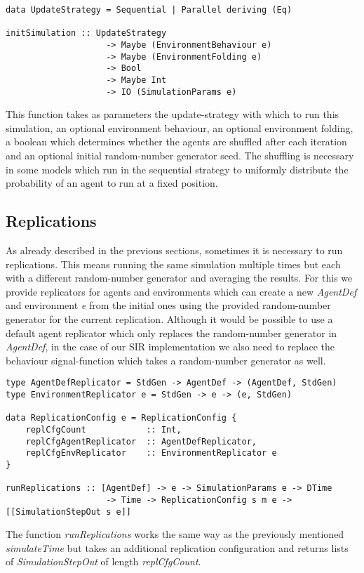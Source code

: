\begin{verbatim}
data UpdateStrategy = Sequential | Parallel deriving (Eq)

initSimulation :: UpdateStrategy
                    -> Maybe (EnvironmentBehaviour e)
                    -> Maybe (EnvironmentFolding e)
                    -> Bool
                    -> Maybe Int
                    -> IO (SimulationParams e)
\end{verbatim}

This function takes as parameters the update-strategy with which to run this simulation, an optional environment behaviour, an optional environment folding, a boolean which determines whether the agents are shuffled after each iteration and an optional initial random-number generator seed. The shuffling is necessary in some models which run in the sequential strategy to uniformly distribute the probability of an agent to run at a fixed position.

\subsection*{Replications}
As already described in the previous sections, sometimes it is necessary to run replications. This means running the same simulation multiple times but each with a different random-number generator and averaging the results. For this we provide replicators for agents and environments which can create a new \textit{AgentDef} and environment \textit{e} from the initial ones using the provided random-number generator for the current replication. Although it would be possible to use a default agent replicator which only replaces the random-number generator in \textit{AgentDef}, in the case of our SIR implementation we also need to replace the behaviour signal-function which takes a random-number generator as well.

\begin{verbatim}
type AgentDefReplicator = StdGen -> AgentDef -> (AgentDef, StdGen)
type EnvironmentReplicator e = StdGen -> e -> (e, StdGen)

data ReplicationConfig e = ReplicationConfig {
    replCfgCount            :: Int,
    replCfgAgentReplicator  :: AgentDefReplicator,
    replCfgEnvReplicator    :: EnvironmentReplicator e
}

runReplications :: [AgentDef] -> e -> SimulationParams e -> DTime
                    -> Time -> ReplicationConfig s m e -> [[SimulationStepOut s e]]
\end{verbatim}

The function \textit{runReplications} works the same way as the previously mentioned \textit{simulateTime} but takes an additional replication configuration and returns lists of \textit{SimulationStepOut} of length \textit{replCfgCount}.